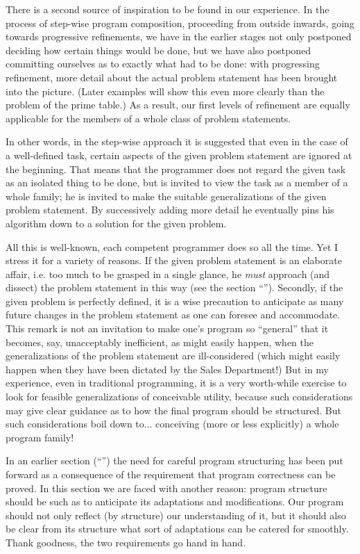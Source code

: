 There is a second source of inspiration to be found in our experience. In the process of step-wise program composition, proceeding from outside inwards, going towards progressive refinements, we have in the earlier stages not only postponed deciding how certain things would be done, but we have also postponed committing ourselves as to exactly what had to be done: with progressing refinement, more detail about the actual problem statement has been brought into the picture. (Later examples will show this even more clearly than the problem of the prime table.) As a result, our first levels of refinement are equally applicable for the members of a whole class of problem statements.

In other words, in the step-wise approach it is suggested that even in the case of a well-defined task, certain aspects of the given problem statement are ignored at the beginning. That means that the programmer does not regard the given task as an isolated thing to be done, but is invited to view the task as a member of a whole family; he is invited to make the suitable generalizations of the given problem statement. By successively adding more detail he eventually pins his algorithm down to a solution for the given problem.

All this is well-known, each competent programmer does so all the time. Yet I stress it for a variety of reasons. If the given problem statement is an elaborate affair, i.e. too much to be grasped in a single glance, he \textit{must} approach (and dissect) the problem statement in this way (see the section ``''). Secondly, if the given problem is perfectly defined, it is a wise precaution to anticipate as many future changes in the problem statement as one can foresee and accommodate. This remark is not an invitation to make one's program so ``general'' that it becomes, say, unacceptably inefficient, as might easily happen, when the generalizations of the problem statement are ill-considered (which might easily happen when they have been dictated by the Sales Department!) But in my experience, even in traditional programming, it is a very worth-while exercise to look for feasible generalizations of conceivable utility, because such considerations may give clear guidance as to how the final program should be structured. But such considerations boil down to... conceiving (more or less explicitly) a whole program family!

In an earlier section (``'') the need for careful program structuring has been put forward as a consequence of the requirement that program correctness can be proved. In this section we are faced with another reason: program structure should be such as to anticipate its adaptations and modifications. Our program should not only reflect (by structure) our understanding of it, but it should also be clear from its structure what sort of adaptations can be catered for smoothly. Thank goodness, the two requirements go hand in hand.

